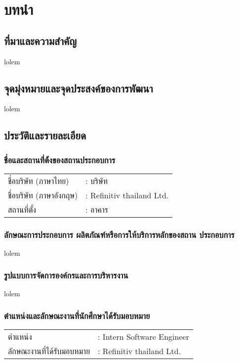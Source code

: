 \chapter{บทนำ}
\label{chapter:introduction}

\section{ที่มาและความสำคัญ}

lolem

\section{จุดมุ่งหมายและจุดประสงค์ของการพัฒนา}

lolem

\section{ประวัติและรายละเอียด}

\subsection{ชื่อและสถานที่ต้้งของสถานประกอบการ}
\begin{table}[h]
    \begin{tabular}{ll}
    ชื่อบริษัท (ภาษาไทย) & : บริษัท  \\
    ชื่อบริษัท (ภาษาอังกฤษ) & : Refinitiv thailand Ltd. \\
    สถานที่ตั้ง  & : อาคาร \\
    \end{tabular}
\end{table}


\subsection{ลักษณะการประกอบการ ผลิตภัณฑ์หรือการให้บริการหลักของสถาน ประกอบการ}
lolem


\subsection{รูปแบบการจัดการองค์กรและการบริหารงาน}
lolem


\subsection{ตำแหน่งและลักษณะงานที่นักศึกษาได้รับมอบหมาย}
\begin{table}[h]
    \begin{tabular}{ll}
    ตำแหน่ง & : Intern Software Engineer \\
    ลักษณะงานที่ได้รับมอบหมาย   & : Refinitiv thailand Ltd.  \\    
    \end{tabular}
\end{table}

